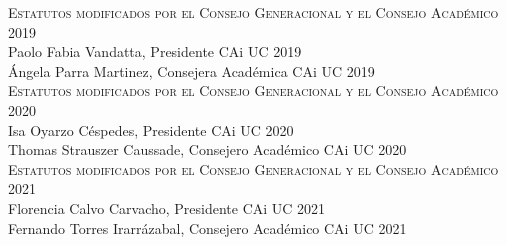 \documentclass[letterpaper,11pt]{article}
\theoremstyle{definition}%
\begin{document}
\begin{sloppypar}
	\textsc{Estatutos modificados por el Consejo Generacional y el Consejo Académico 2019}\\
	Paolo Fabia Vandatta, Presidente CAi UC 2019\\
	Ángela Parra Martinez, Consejera Académica CAi UC 2019\\

	\textsc{Estatutos modificados por el Consejo Generacional y el Consejo Académico 2020}\\
	Isa Oyarzo Céspedes, Presidente CAi UC 2020\\
	Thomas Strauszer Caussade, Consejero Académico CAi UC 2020\\

	\textsc{Estatutos modificados por el Consejo Generacional y el Consejo Académico 2021}\\
	Florencia Calvo Carvacho, Presidente CAi UC 2021\\
	Fernando Torres Irarrázabal, Consejero Académico CAi UC 2021\\

\end{sloppypar}
\end{document}
